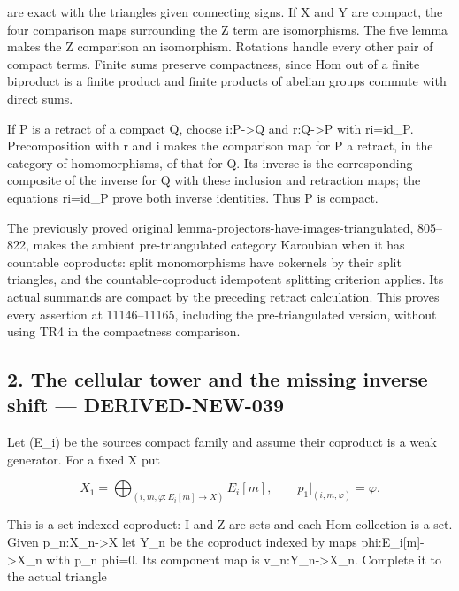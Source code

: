 are exact with the triangle\textquotesingle s given connecting signs. If X and Y are compact,\allowbreak{} the four comparison maps surrounding the Z term are isomorphisms. The five lemma makes the Z comparison an isomorphism. Rotations handle every other pair of compact terms. Finite sums preserve compactness,\allowbreak{} since Hom out of a finite biproduct is a finite product and finite products of abelian groups commute with direct sums.

If P is a retract of a compact Q,\allowbreak{} choose i:\allowbreak{}P\allowbreak{}->Q and r:\allowbreak{}Q\allowbreak{}->P with ri\allowbreak{}=id\_\allowbreak{}P. Precomposition with r and i makes the comparison map for P a retract,\allowbreak{} in the category of homomorphisms,\allowbreak{} of that for Q. Its inverse is the corresponding composite of the inverse for Q with these inclusion and retraction maps; the equations ri\allowbreak{}=id\_\allowbreak{}P prove both inverse identities. Thus P is compact.

The previously proved original lemma-projectors-have-images-triangulated,\allowbreak{} 805–\allowbreak{}822,\allowbreak{} makes the ambient pre-triangulated category Karoubian when it has countable coproducts:\allowbreak{} split monomorphisms have cokernels by their split triangles,\allowbreak{} and the countable-coproduct idempotent splitting criterion applies. Its actual summands are compact by the preceding retract calculation. This proves every assertion at 11146–\allowbreak{}11165,\allowbreak{} including the pre-triangulated version,\allowbreak{} without using TR4 in the compactness comparison.

\subsection{2. The cellular tower and the missing inverse shift --- DERIVED-NEW-039}\label{proofs-11121-11450-the-cellular-tower-and-the-missing-inverse-shift-derived-new-039}

Let (E\_\allowbreak{}i)\allowbreak{} be the source\textquotesingle s compact family and assume their coproduct is a weak generator. For a fixed X put

\[
 X_1=\bigoplus_{(i,m,\varphi:E_i[m]\to X)}E_i[m],
 \qquad p_1|_{(i,m,\varphi)}=\varphi.
\]

This is a set-indexed coproduct:\allowbreak{} I and Z are sets and each Hom collection is a set. Given p\_\allowbreak{}n:\allowbreak{}X\_\allowbreak{}n\allowbreak{}->X let Y\_\allowbreak{}n be the coproduct indexed by maps phi:\allowbreak{}E\_\allowbreak{}i[m]\allowbreak{}\allowbreak{}->X\_\allowbreak{}n with p\_\allowbreak{}n phi\allowbreak{}=0. Its component map is v\_\allowbreak{}n:\allowbreak{}Y\_\allowbreak{}n\allowbreak{}->X\_\allowbreak{}n. Complete it to the actual triangle

